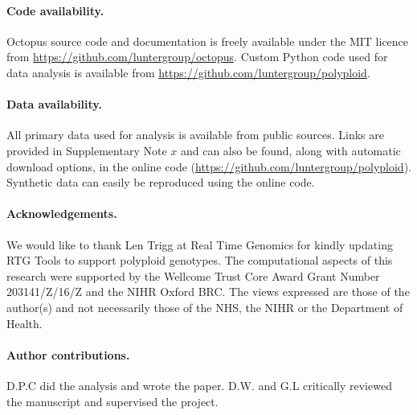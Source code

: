 \documentclass[notitlepage, twocolumn, 10pt]{article}
\begin{document}
\paragraph*{Code availability.} Octopus source code and documentation is freely available under the MIT licence from \url{https://github.com/luntergroup/octopus}. Custom Python code used for data analysis is available from \url{https://github.com/luntergroup/polyploid}.

\paragraph*{Data availability.} All primary data used for analysis is available from public sources. Links are provided in Supplementary Note $x$ and can also be found, along with automatic download options, in the online code (\url{https://github.com/luntergroup/polyploid}). Synthetic data can easily be reproduced using the online code.

\paragraph*{Acknowledgements.} We would like to thank Len Trigg at Real Time Genomics for kindly updating RTG Tools to support polyploid genotypes. The computational aspects of this research were supported by the Wellcome Trust Core Award Grant Number 203141/Z/16/Z and the NIHR Oxford BRC. The views expressed are those of the author(s) and not necessarily those of the NHS, the NIHR or the Department of Health.

\paragraph*{Author contributions.} D.P.C did the analysis and wrote the paper. D.W. and G.L critically reviewed the manuscript and supervised the project.
\end{document}
